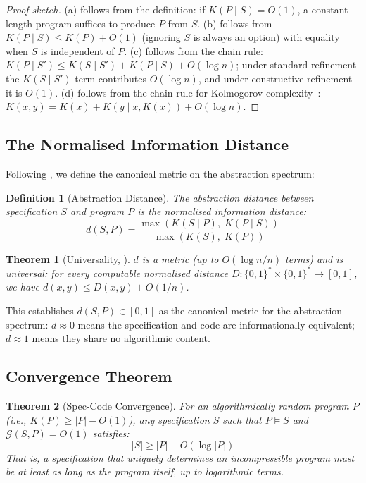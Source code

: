 \documentclass[11pt, a4paper, logo, copyright]{googledeepmind}
\newtheorem{definition}{Definition}[section]
\newtheorem{theorem}{Theorem}[section]
\begin{document}
\begin{proof}[Proof sketch]
(a) follows from the definition: if $K(P \mid S) = O(1)$, a constant-length program suffices to produce $P$ from $S$. (b) follows from $K(P \mid S) \leq K(P) + O(1)$ (ignoring $S$ is always an option) with equality when $S$ is independent of $P$. (c) follows from the chain rule: $K(P \mid S') \leq K(S \mid S') + K(P \mid S) + O(\log n)$; under standard refinement the $K(S \mid S')$ term contributes $O(\log n)$, and under constructive refinement it is $O(1)$. (d) follows from the chain rule for Kolmogorov complexity~\citep{kolmogorov1965three}: $K(x, y) = K(x) + K(y \mid x, K(x)) + O(\log n)$.
\end{proof}

\subsection{The Normalised Information Distance}

Following \citet{li2004similarity}, we define the canonical metric on the abstraction spectrum:

\begin{definition}[Abstraction Distance]
The \emph{abstraction distance} between specification $S$ and program $P$ is the normalised information distance:
\begin{equation}
    d(S, P) = \frac{\max(K(S \mid P),\; K(P \mid S))}{\max(K(S),\; K(P))}
\end{equation}
\end{definition}

\begin{theorem}[Universality, \citealp{li2004similarity}]
\label{thm:nid}
$d$ is a metric (up to $O(\log n / n)$ terms) and is \emph{universal}: for every computable normalised distance $D: \{0,1\}^* \times \{0,1\}^* \to [0,1]$, we have $d(x, y) \leq D(x, y) + O(1/n)$.
\end{theorem}

This establishes $d(S, P) \in [0, 1]$ as the canonical metric for the abstraction spectrum: $d \approx 0$ means the specification and code are informationally equivalent; $d \approx 1$ means they share no algorithmic content.

\subsection{Convergence Theorem}

\begin{theorem}[Spec-Code Convergence]
\label{thm:convergence}
For an algorithmically random program $P$ (i.e., $K(P) \geq |P| - O(1)$), any specification $S$ such that $P \models S$ and $\mathcal{G}(S, P) = O(1)$ satisfies:
\begin{equation}
    |S| \geq |P| - O(\log |P|)
\end{equation}
That is, a specification that uniquely determines an incompressible program must be at least as long as the program itself, up to logarithmic terms.
\end{theorem}
\end{document}
